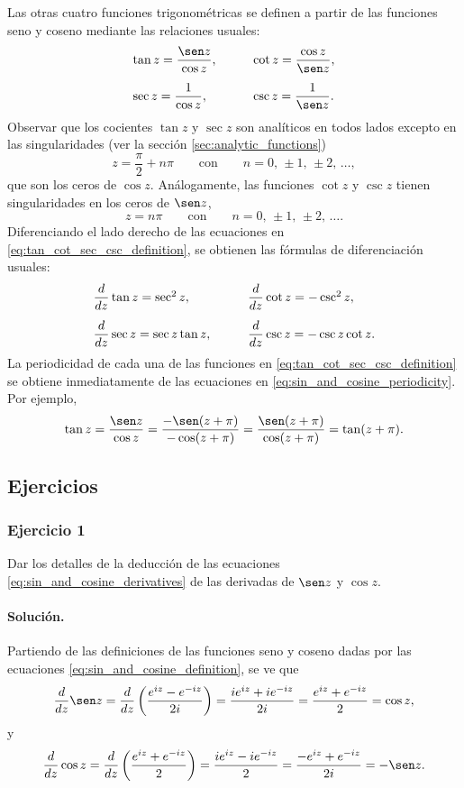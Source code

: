 \documentclass[a4paper]{report}
\begin{document}
Las otras cuatro funciones trigonométricas se definen a partir de las funciones seno y coseno mediante las relaciones usuales:
\begin{equation}\label{eq:tan_cot_sec_csc_definition}
 \begin{array}{ll}
  \tan z=\dfrac{\sen z}{\cos z}, &\qquad\cot z=\dfrac{\cos z}{\sen z},\\[\bigskipamount]
  \sec z=\dfrac{1}{\cos z}, &\qquad\csc z=\dfrac{1}{\sen z}. 
 \end{array} 
\end{equation}
Observar que los cocientes \(\tan z\) y \(\sec z\) son analíticos en todos lados excepto en las singularidades (ver la sección \ref{sec:analytic_functions})
\[
 z=\frac{\pi}{2}+n\pi
 \qquad\textrm{con}\qquad 
 n=0,\,\pm1,\,\pm2,\,\dots,
\]
que son los ceros de \(\cos z\). Análogamente, las funciones \(\cot z\) y \(\csc z\) tienen singularidades en los ceros de \(\sen z\),
\[
 z=n\pi
 \qquad\textrm{con}\qquad 
 n=0,\,\pm1,\,\pm2,\,\dots.
\]
Diferenciando el lado derecho de las ecuaciones en \ref{eq:tan_cot_sec_csc_definition}, se obtienen las fórmulas de diferenciación usuales:
\begin{equation}\label{eq:tan_cot_sec_csc_derivatives}
 \begin{array}{ll}
  \dfrac{d}{dz}\tan z=\sec^2z, &\qquad\dfrac{d}{dz}\cot z=-\csc^2z,\\[\bigskipamount]
  \dfrac{d}{dz}\sec z=\sec z\tan z, &\qquad\dfrac{d}{dz}\csc z=-\csc z\cot z. 
 \end{array} 
\end{equation}
La periodicidad de cada una de las funciones en \ref{eq:tan_cot_sec_csc_definition} se obtiene inmediatamente de las ecuaciones en \ref{eq:sin_and_cosine_periodicity}. Por ejemplo,
\[
 \tan z=\frac{\sen z}{\cos z}=\frac{-\sen(z+\pi)}{-\cos(z+\pi)}=\frac{\sen(z+\pi)}{\cos(z+\pi)}=\tan(z+\pi).
\]

\subsection*{Ejercicios}

\subsubsection{Ejercicio 1}

Dar los detalles de la deducción de las ecuaciones \ref{eq:sin_and_cosine_derivatives} de las derivadas de \(\sen z\) y \(\cos z\).

\paragraph{Solución.} Partiendo de las definiciones de las funciones seno y coseno dadas por las ecuaciones \ref{eq:sin_and_cosine_definition}, se ve que 
\[
 \frac{d}{dz}\sen z=\frac{d}{dz}\left(\frac{e^{iz}-e^{-iz}}{2i}\right)
 =\frac{ie^{iz}+ie^{-iz}}{2i}=\frac{e^{iz}+e^{-iz}}{2}=\cos z,
\]
y
\[
 \frac{d}{dz}\cos z=\frac{d}{dz}\left(\frac{e^{iz}+e^{-iz}}{2}\right)
 =\frac{ie^{iz}-ie^{-iz}}{2}=\frac{-e^{iz}+e^{-iz}}{2i}=-\sen z.
\]
\end{document}
